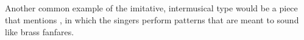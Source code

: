 
\subsection{}

Another common example of the imitative, intermusical type would be a piece 
that mentions , in which the singers 
perform patterns that are meant to sound like brass fanfares.
